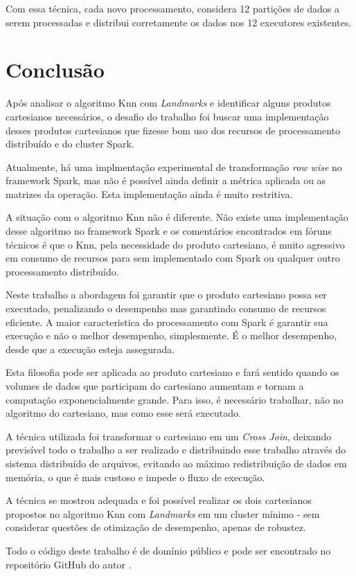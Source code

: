 \documentclass[12pt]{article}
\begin{document}
Com essa técnica, cada novo processamento, considera 12 partições de dados a serem processadas e distribui corretamente os dados nos 12 executores existentes.

\section{Conclusão}\label{concl}

Após analisar o algoritmo Knn com \textit{Landmarks} e identificar alguns produtos cartesianos necessários, o desafio do trabalho foi buscar uma implementação desses produtos cartesianos que fizesse bom uso dos recursos de processamento distribuído e do cluster Spark.

Atualmente, há uma implmentação experimental de transformação \textit{row wise} no framework Spark, mas não é possível ainda definir a métrica aplicada ou as matrizes da operação. Esta implementação ainda é muito restritiva.

A situação com o algoritmo Knn não é diferente. Não existe uma implementação desse algoritmo no framework Spark e os comentários encontrados em fóruns técnicos é que o Knn, pela necessidade do produto cartesiano, é muito agressivo em consumo de recursos para sem implementado com Spark ou qualquer outro processamento distribuído.

Neste trabalho a abordagem foi garantir que o produto cartesiano possa ser executado, penalizando o desempenho mas garantindo consumo de recursos eficiente. A maior caracteristica do processamento com Spark é garantir sua execução e não o melhor desempenho, simplesmente. É o melhor desempenho, desde que a execução esteja assegurada.

Esta filosofia pode ser aplicada ao produto cartesiano e fará sentido quando os volumes de dados que participam do cartesiano aumentam e tornam a computação exponencialmente grande. Para isso, é necessário trabalhar, não no algoritmo do cartesiano, mas como esse será executado.

A técnica utilizada foi transformar o cartesiano em um \textit{Cross Join}, deixando previsível todo o trabalho a ser realizado e distribuindo esse trabalho através do sistema distribuído de arquivos, evitando ao máximo redistribuição de dados em memória, o que é mais custoso e impede o fluxo de execução.

A técnica se mostrou adequada e foi possível realizar os dois cartesianos propostos no algoritmo Knn com \textit{Landmarks} em um cluster mínimo - sem considerar questões de otimização de desempenho, apenas de robustez. 

Todo o código deste trabalho é de domínio público e pode ser encontrado no repositório GitHub do autor \cite{coichedid:19}.




\end{document}
